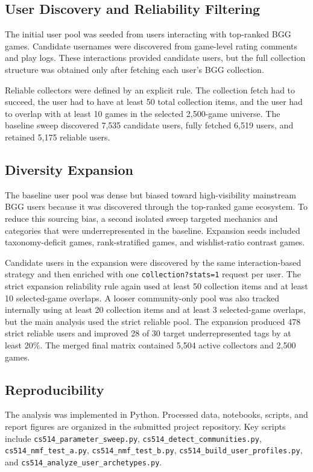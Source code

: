\documentclass[10pt,twocolumn]{article}
\begin{document}
\subsection{User Discovery and Reliability Filtering}

The initial user pool was seeded from users interacting with top-ranked BGG games. Candidate usernames were discovered from game-level rating comments and play logs. These interactions provided candidate users, but the full collection structure was obtained only after fetching each user's BGG collection.

Reliable collectors were defined by an explicit rule. The collection fetch had to succeed, the user had to have at least 50 total collection items, and the user had to overlap with at least 10 games in the selected 2,500-game universe. The baseline sweep discovered 7,535 candidate users, fully fetched 6,519 users, and retained 5,175 reliable users.

\subsection{Diversity Expansion}

The baseline user pool was dense but biased toward high-visibility mainstream BGG users because it was discovered through the top-ranked game ecosystem. To reduce this sourcing bias, a second isolated sweep targeted mechanics and categories that were underrepresented in the baseline. Expansion seeds included taxonomy-deficit games, rank-stratified games, and wishlist-ratio contrast games.

Candidate users in the expansion were discovered by the same interaction-based strategy and then enriched with one \texttt{collection?stats=1} request per user. The strict expansion reliability rule again used at least 50 collection items and at least 10 selected-game overlaps. A looser community-only pool was also tracked internally using at least 20 collection items and at least 3 selected-game overlaps, but the main analysis used the strict reliable pool. The expansion produced 478 strict reliable users and improved 28 of 30 target underrepresented tags by at least 20\%. The merged final matrix contained 5,504 active collectors and 2,500 games.

\subsection{Reproducibility}

The analysis was implemented in Python. Processed data, notebooks, scripts, and report figures are organized in the submitted project repository. Key scripts include \texttt{cs514\_parameter\_sweep.py}, \texttt{cs514\_detect\_communities.py}, \texttt{cs514\_nmf\_test\_a.py}, \texttt{cs514\_nmf\_test\_b.py}, \texttt{cs514\_build\_user\_profiles.py}, and \texttt{cs514\_analyze\_user\_archetypes.py}.
\end{document}
